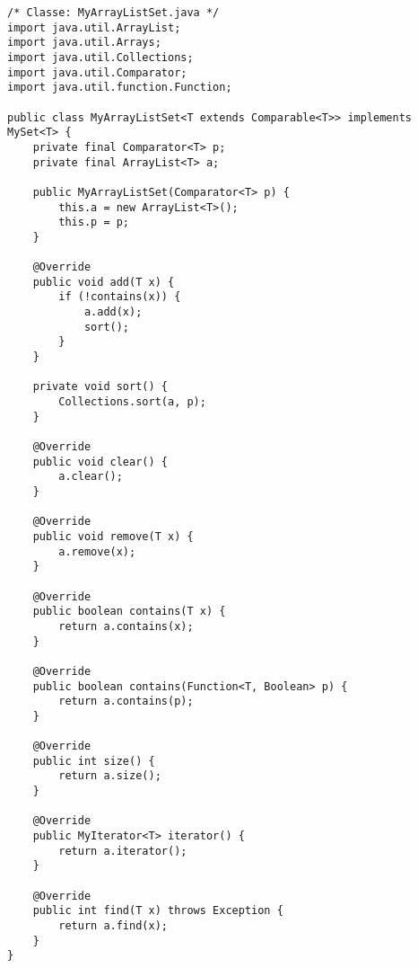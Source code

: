\begin{lstlisting}
/* Classe: MyArrayListSet.java */
import java.util.ArrayList;
import java.util.Arrays;
import java.util.Collections;
import java.util.Comparator;
import java.util.function.Function;

public class MyArrayListSet<T extends Comparable<T>> implements MySet<T> {
    private final Comparator<T> p;
    private final ArrayList<T> a;

    public MyArrayListSet(Comparator<T> p) {
        this.a = new ArrayList<T>();
        this.p = p;
    }

    @Override
    public void add(T x) {
        if (!contains(x)) {
            a.add(x);
            sort();
        }
    }

    private void sort() {
        Collections.sort(a, p);
    }

    @Override
    public void clear() {
        a.clear();
    }

    @Override
    public void remove(T x) {
        a.remove(x);
    }

    @Override
    public boolean contains(T x) {
        return a.contains(x);
    }

    @Override
    public boolean contains(Function<T, Boolean> p) {
        return a.contains(p);
    }

    @Override
    public int size() {
        return a.size();
    }

    @Override
    public MyIterator<T> iterator() {
        return a.iterator();
    }

    @Override
    public int find(T x) throws Exception {
        return a.find(x);
    }
}
\end{lstlisting}





